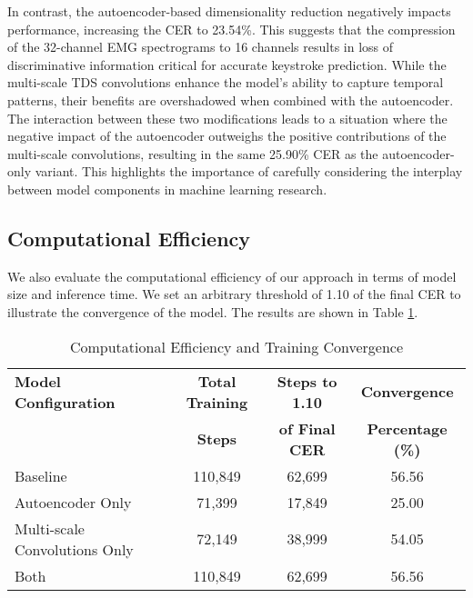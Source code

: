 In contrast, the autoencoder-based dimensionality reduction negatively impacts performance, increasing the CER to 23.54\%. This suggests that the compression of the 32-channel EMG spectrograms to 16 channels results in loss of discriminative information critical for accurate keystroke prediction. While the multi-scale TDS convolutions enhance the model's ability to capture temporal patterns, their benefits are overshadowed when combined with the autoencoder. The interaction between these two modifications leads to a situation where the negative impact of the autoencoder outweighs the positive contributions of the multi-scale convolutions, resulting in the same 25.90\% CER as the autoencoder-only variant. This highlights the importance of carefully considering the interplay between model components in machine learning research.

\subsection{Computational Efficiency}

We also evaluate the computational efficiency of our approach in terms of model size and inference time. We set an arbitrary threshold of 1.10 of the final CER to illustrate the convergence of the model. The results are shown in Table \ref{tab:computational_efficiency}.

\begin{table}[h]
    \centering
    \caption{Computational Efficiency and Training Convergence}
    \begin{tabular}{lccc}
        \hline
        \textbf{Model Configuration}  & \textbf{Total Training} & \textbf{Steps to 1.10} & \textbf{Convergence}     \\
                                      & \textbf{Steps}          & \textbf{of Final CER}  & \textbf{Percentage (\%)} \\
        \hline
        Baseline                      & 110,849                 & 62,699                 & 56.56                    \\
        Autoencoder Only              & 71,399                  & 17,849                 & 25.00                    \\
        Multi-scale Convolutions Only & 72,149                  & 38,999                 & 54.05                    \\
        Both                          & 110,849                 & 62,699                 & 56.56                    \\
        \hline
    \end{tabular}
    \label{tab:computational_efficiency}
\end{table}

